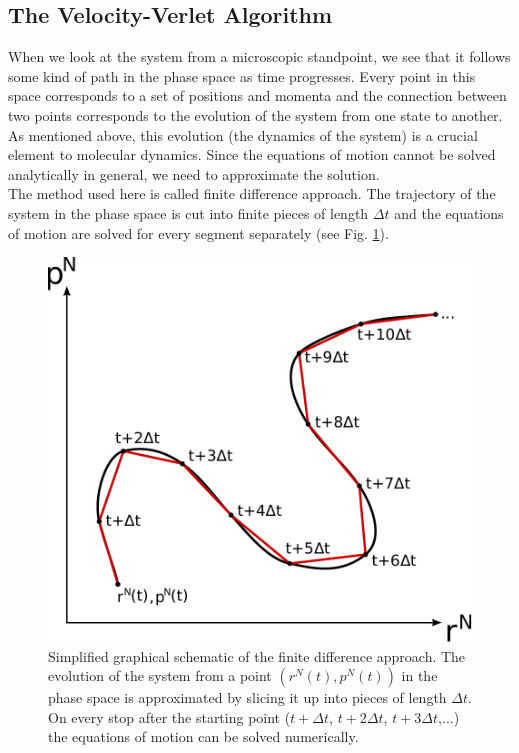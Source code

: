 \documentclass[12pt]{article}
\begin{document}
\subsection{The Velocity-Verlet Algorithm}
\label{section:verlet}
When we look at the system from a microscopic standpoint, we see that it follows some kind of path in the phase space as time progresses. Every
point in this space corresponds to a set of positions and momenta and the connection between two points corresponds to the evolution of the system
from one state to another. As mentioned above, this evolution (the dynamics of the system) is a crucial element to molecular dynamics. Since the
equations of motion cannot be solved analytically in general, we need to approximate the solution.\\
The method used here is called finite difference approach. The trajectory of the system in the phase space is cut into finite pieces of length $\Delta
t$ and the equations of motion are solved for every segment separately (see Fig. \ref{fig:finitedifference}).\\
\begin{figure}
    \begin{center}
        \includegraphics[scale=0.5]{images/finite_approach.pdf}
        \caption{Simplified graphical schematic of the finite difference approach. The evolution of the system from a point $(r^N(t),p^N(t))$ in the
            phase space is approximated by slicing it up into pieces of length $\Delta t$. On every stop after the starting point ($t+\Delta t$, 
            $t+2\Delta t$, $t+3\Delta t$,$\ldots$) the equations of motion can be solved numerically.}
        \label{fig:finitedifference} 
    \end{center}
\end{figure}
\end{document}
